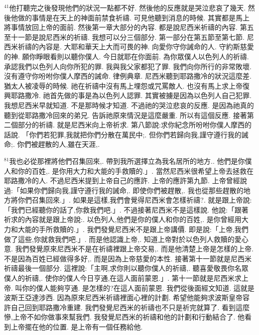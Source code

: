 \documentclass{book}
\begin{document}
$^{41}$他打聽完之後發現他們的狀況一點都不好.
然後他的反應就是哭泣悲哀了幾天.
然後他做的事情是在天上的神面前禁食祈禱.
可見他聽到消息的時候.
其實都是馬上將事情放回上帝的面前.
然後第一章大部分的內容.
都是說尼西米祈禱的內容.
第五至十一節是說尼西米的祈禱.
我想可以分三個部分.
第一部分在第五節至第七節.
尼西米祈禱的內容是.
大耶和華天上大而可畏的神.
向愛你守你誡命的人.
守約斯慈愛的神.
願你睜眼看則以聽你僕人.
今日就耶在你面前.
為你眾僕人以色列人的祈禱.
承認我們以色列人向你所犯的罪.
我與我父家都犯了罪.
我們向你所行的非常敗壞.
沒有遵守你吩咐你僕人摩西的誡命.
律例典章.
尼西米聽到耶路撒冷的狀況這麼差.
猶太人被凌辱的時候.
祂在祈禱中沒有馬上埋怨或咒罵敵人.
也沒有馬上求上帝復興耶路撒冷.
祂首先做的事是為以色列人認罪.
其實被擄是因為以色列人自己犯罪.
我想尼西米早就知道.
不是那時候才知道.
不過祂的哭泣悲哀的反應.
是因為祂真的聽到從耶路撒冷回來的弟兄.
告訴祂原來情況是這麼嚴重.
所以有這個反應.
接著第二個部分的祈禱.
就是尼西米向上帝祈求.
第八節說:求你紀念所吩咐你僕人摩西的話說.
「你們若犯罪,我就把你們分散在萬民中;.
但你們若歸向我,謹守遵行我的誡命;.
你們被趕散的人,雖在天涯,.

$^{81}$我也必從那裡將他們召集回來,.
帶到我所選擇立為我名居所的地方..
他們是你僕人和你的百姓,.
是你用大力和大能的手救贖的.」.
當然尼西米很希望上帝去拯救在耶路撒冷的人.
不過尼西米提到上帝自己的應許.
上帝的應許第九節.
上帝曾經說過:「如果你們歸向我,謹守遵行我的誡命,.
即使你們被趕散,.
我也從那些趕散的地方將你們召集回來.」.
如果是這樣,我們會覺得尼西米會怎樣祈禱?.
就是跟上帝說:「我們已經聽你的話了,你救我們吧.」.
不過接著尼西米不是這樣說.
他說:「跟著祈求的內容就是跟上帝說:.
以色列人,他們是你的僕人和你的百姓,.
是你曾經用大力和大能的手所救贖的.」.
我們發覺尼西米不是跟上帝講價.
即是說:「上帝,我們做了這些,你就救我們吧.」.
而是他認識上帝,.
知道上帝對於以色列人救贖的愛心意.
我們發覺原來尼西米不是在祈禱裡跟上帝交易,.
而是他清楚上帝是怎樣的上帝.
不是因為百姓已經做得多好,.
而是因為上帝慈愛的本性.
接著第十一節就是尼西米祈禱最後一個部分.
這裡說:「主啊,求你則以聽你僕人的祈禱,.
聽喜愛敬畏你名眾僕人的祈禱,.
使你的僕人今日亨通,在這人面前蒙恩.」.
第十一節就是尼西米求上帝.
叫你的僕人能夠亨通.
是怎樣的?在這人面前蒙恩.
我們從後面經文知道.
這就是波斯王亞達涉西.
因為原來尼西米祈禱裡面心裡的計劃.
希望他能夠求波斯皇帝容許自己回到耶路撒冷重建.
我們發覺尼西米的祈禱也不只是祈完就算了.
看到這麼慘,上帝不如你做事來幫我們.
我發覺尼西米的祈禱和他的計劃和行動結合了.
他看到上帝擺在他的位置.
是上帝有一個任務給他.
\end{document}

